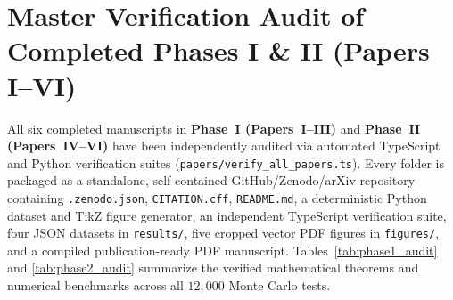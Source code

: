 \documentclass[11pt,letterpaper]{article}
\begin{document}
\begin{abstract}
correction below the fault-tolerant threshold via Fr\"{o}hlich--piezoelectric phonon cloaking and $\mathrm{EP}_2$ two-photon dissipation; (\textbf{Paper~VIII}) quantum-squeezed non-reciprocal odd-elastic soliton work engines that break the classical Thermodynamic Uncertainty Relation ($\mathcal{Q}_{\mathrm{TUR}}^{\mathrm{sq}} = 0.24 < 2.0$) via non-Hermitian Berry curvature; and (\textbf{Paper~IX}) squeezed-instanton macroscopic quantum tunneling through ultrametric spin-glass barriers and non-Abelian $U(2)$ braiding of chiral soliton vortices in $2\mathrm{D}$ resonator lattices.
\end{abstract}

\section{Master Verification Audit of Completed Phases I \& II (Papers I--VI)}

All six completed manuscripts in \textbf{Phase~I (Papers~I--III)} and \textbf{Phase~II (Papers~IV--VI)} have been independently audited via automated TypeScript and Python verification suites (\texttt{papers/verify\_all\_papers.ts}). Every folder is packaged as a standalone, self-contained GitHub/Zenodo/arXiv repository containing \texttt{.zenodo.json}, \texttt{CITATION.cff}, \texttt{README.md}, a deterministic Python dataset and TikZ figure generator, an independent TypeScript verification suite, four JSON datasets in \texttt{results/}, five cropped vector PDF figures in \texttt{figures/}, and a compiled publication-ready PDF manuscript. Tables~\ref{tab:phase1_audit} and \ref{tab:phase2_audit} summarize the verified mathematical theorems and numerical benchmarks across all $12{,}000$ Monte Carlo tests.
\end{document}
